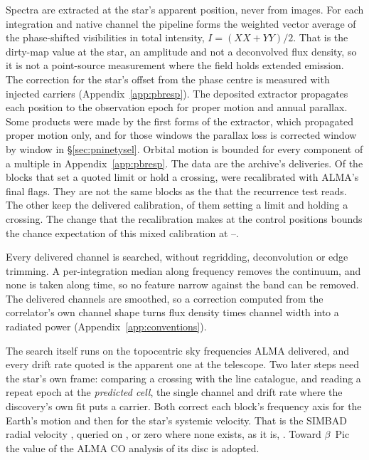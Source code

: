 Spectra are extracted at the star's apparent position, never from images. For
each integration and native channel the pipeline forms the weighted vector
average of the phase-shifted visibilities in total intensity, $I=(XX+YY)/2$.
That is the dirty-map value at the star, an amplitude and not a deconvolved
flux density, so it is not a point-source measurement where the field holds
extended emission. The correction for the star's offset from the phase
centre is measured with injected carriers (Appendix~\ref{app:pbresp}).
The deposited extractor propagates each position to the observation epoch
for proper motion and annual parallax. Some products were made by the first
forms of the extractor, which propagated proper motion only, and for those
windows the parallax loss is corrected window by window in
\S\ref{sec:pninetysel}.
Orbital motion is bounded for every component of a multiple in
Appendix~\ref{app:pbresp}.
%
The data are the archive's deliveries. Of the \RflNEbCoreAll{} blocks that
set a quoted limit or hold a crossing, \RflNEbCore{} were recalibrated with
ALMA's final flags. They are not the same blocks as the \ZcNRecEB{} that
the recurrence test reads. The other \RflNEbNot{} keep the delivered
calibration, \RflNNotLim{} of them setting a limit and \RflNNotCross{}
holding a crossing. The change that the recalibration makes at the control
positions bounds the chance expectation of this mixed calibration at
\RflCeLo--\RflCeHi.

Every delivered channel is searched, without regridding, deconvolution or
edge trimming. A per-integration median along frequency removes the
continuum, and none is taken along time, so no feature narrow against the
band can be removed. The delivered channels are smoothed, so a correction
computed from the correlator's own channel shape turns flux density times
channel width into a radiated power (Appendix~\ref{app:conventions}).

The search itself runs on the topocentric sky frequencies ALMA delivered, and
every drift rate quoted is the apparent one at the telescope. Two later steps
need the star's own frame: comparing a crossing with the line catalogue, and
reading a repeat epoch at the \emph{predicted cell}, the single channel and
drift rate where the discovery's own fit puts a carrier. Both correct each
block's frequency axis for the Earth's motion and then for the star's
systemic velocity. That is the SIMBAD radial velocity \citep{SIMBAD2000},
queried on \SimbadQueryDate, or zero where none exists, as it is,
\FrZeroVsysClause. Toward $\beta$~Pic the value of the ALMA CO analysis of
its disc \citep{Matra2017} is adopted.

